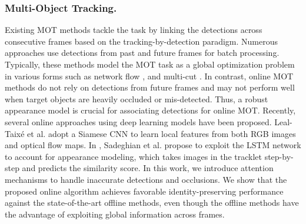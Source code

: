 \documentclass[runningheads]{llncs}
\begin{document}
  \subsubsection{Multi-Object Tracking.}
  Existing MOT methods tackle the task by linking the detections across consecutive frames based on the tracking-by-detection paradigm. 
Numerous approaches \cite{milan2014continuous,pirsiavash2011globally,zhang2008global,JMC,QuadMOT,wang2016tracking,LMP} use detections from past and future frames for batch processing. 
Typically, these methods model the MOT task as a global optimization problem in various forms such as 
network flow \cite{zhang2008global,wang2016tracking,dehghan2015target}, and multi-cut \cite{JMC,LMP,tang2015subgraph}. 
In contrast, online MOT methods \cite{MDP,STAM,leal2016learning} do not rely on detections from future frames and may not perform well when target objects are heavily occluded or mis-detected.  
Thus, a robust appearance model is crucial for associating detections for online MOT. 
Recently, several online approaches \cite{STAM,leal2016learning,milan2017online,AMIR,CDA_DDAL} using deep learning models have been proposed. 
Leal-Taix{\'e} et al. \cite{leal2016learning} adopt a Siamese CNN to learn local features from both RGB images and optical flow maps. In \cite{AMIR}, Sadeghian et al. propose to exploit the LSTM network to account for appearance modeling, which takes images in the tracklet step-by-step and predicts the similarity score. 
In this work, we introduce attention mechanisms to handle inaccurate detections and occlusions. 
We show that the proposed online algorithm achieves favorable identity-preserving performance against the state-of-the-art offline methods, even though the offline methods have the advantage of exploiting global information across frames. 
  
\end{document}
